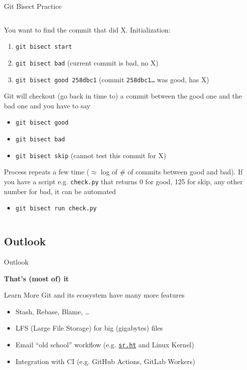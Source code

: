 \documentclass[xetex, handout]{beamer}
\begin{document}
\begin{frame}{Git Bisect Practice}
  \begin{columns}
    \begin{column}{\linewidth}
        You want to find the commit that did X. Initialization:
        \begin{enumerate}
          \item \texttt{git bisect start}
          \item \texttt{git bisect bad} (current commit is bad, no X)
          \item \texttt{git bisect good 258dbc1} (commit \texttt{258dbc1\ldots}
            was good, has X)
        \end{enumerate}
        Git will checkout (go back in time to) a commit between the good one
        and the bad one and you have to say
        \begin{itemize}
          \item \texttt{git bisect good}
          \item \texttt{git bisect bad}
          \item \texttt{git bisect skip} (cannot test this commit for X)
        \end{itemize}
        Process repeats a few time ($\approx$ log of \# of commits between good
        and bad). If you have a script e.g. \texttt{check.py} that returns 0
        for good, 125 for skip, any other number for bad, it can be automated
        \begin{itemize}
          \item \texttt{git bisect run check.py}
        \end{itemize}
    \end{column}
  \end{columns}
\end{frame}

\subsection{Outlook}

\begin{frame}{Outlook}

  \centering
  {
    \Huge\bfseries
    That's (most of) it
  }
  \vspace{1cm}

  \begin{block}{Learn More}
    Git and its ecosystem have many more features
    \begin{itemize}
      \item Stash, Rebase, Blame, \ldots
      \item LFS (Large File Storage) for big (gigabytes) files 
      \item Email ``old school'' workflow (e.g. \href{https://sr.ht}{\texttt{sr.ht}} and Linux Kernel)
      \item Integration with CI (e.g. GitHub Actions, GitLab Workers)
    \end{itemize}
  \end{block}
\end{frame}
\end{document}
